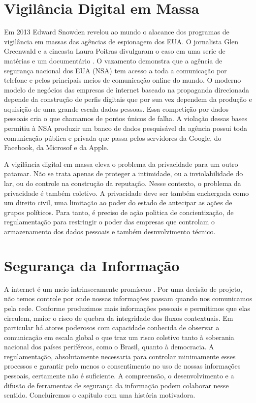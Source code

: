\section{Vigilância Digital em Massa}
\label{sec:vigil-digital}

Em 2013 Edward Snowden revelou ao mundo o alacance dos programas de vigilância em massas das agências de espionagem dos EUA.
O jornalista Glen Greenwald e a cineasta Laura Poitras divulgaram o caso em uma serie de matérias e um documentário \cite{Greenwald14, Poitras14}.
O vazamento demonstra que a agência de segurança nacional dos EUA (NSA) tem acesso a toda a comunicação por telefone e pelos principais meios de comunicação online do mundo.
O moderno modelo de negócios das empresas de internet baseado na propaganda direcionada depende da construção de perfis digitais que por sua vez dependem da produção e aquisição de uma grande escala dados pessoas.
Essa competição por dados pessoais cria o que chamamos de pontos únicos de falha.
A violação dessas bases permitiu à NSA produzir um banco de dados pesquisável da agência possui toda comunicação pública e privada que passa pelos servidores da Google, do Facebook, da Microsof e da Apple.

A vigilância digital em massa eleva o problema da privacidade para um outro patamar.
Não se trata apenas de proteger a intimidade, ou a inviolabilidade do lar, ou do controle na construção da reputação. 
Nesse contexto, o problema da privacidade é também coletivo.
A privacidade deve ser também enchergada como um direito civil, uma limitação ao poder do estado de antecipar as ações de grupos políticos. 
Para tanto, é preciso de ação politica de concientização, de regulamentação para restringir o poder das empresas que controlam o armazenamento dos dados pessoais e também desnvolvimento técnico. 

\section{Segurança da Informação}
\label{sec:seg-inf}

A internet é um meio intrinsecamente promíscuo \cite{}.
Por uma decisão de projeto, não temos controle por onde nossas informações passam quando nos comunicamos pela rede.
Conforme produzimos mais informações pessoais e permitimos que elas circulem, maior o risco de quebra da integridade dos fluxos contextuais.
Em particular há atores poderosos com capacidade conhecida de observar a comunicação em escala global o que traz um risco coletivo tanto à soberania nacional dos países perifércos, como o Brasil, quanto à democracia.
A regulamentação, absolutamente necessaria para controlar minimamente esses processos e garantir pelo menos o consentimento no uso de nossas informações pessoais, certamente não é suficiente.
A compreensão, o desenvolvimento e a difusão de ferramentas de segurança da informação podem colaborar nesse sentido.
Concluiremos o capítulo com uma história motivadora.

